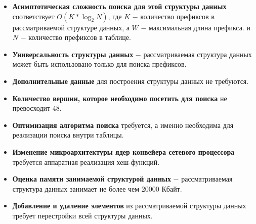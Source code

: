 \documentclass[a4paper, 12pt, titlepage, finall]{extreport}
\begin{document}
            \begin{itemize}
                \item\textbf{Асимптотическая сложность поиска для этой структуры данных} соответствует {\ttfamily $O(K*\log_2{N})$},
                где {\ttfamily $K$} $-$ количество префиксов в рассматриваемой структуре данных, а {\ttfamily $W$} $-$ максимальная длина префикса.
                и {\ttfamily $N$} $-$ количество префиксов в таблице.
                \item\textbf{Универсальность структуры данных} $-$ рассматриваемая структура данных может быть использовано только для поиска префиксов.
                \item\textbf{Дополнительные данные} для построения структуры данных не требуются.
                \item\textbf{Количество вершин, которое необходимо посетить для поиска} не превосходит 48.
                \item\textbf{Оптимизация алгоритма поиска} требуется, а именно необходима для реализации поиска внутри таблицы.
                \item\textbf{Изменение микроархитектуры ядер конвейера сетевого процессора} требуется аппаратная реализация хеш-функций.
                \item\textbf{Оценка памяти занимаемой структурой данных} $-$ рассматриваемая структура данных занимает не более чем 20000 Кбайт.
                \item\textbf{Добавление и удаление элементов} из рассматриваемой структуры данных требует перестройки всей структуры данных.
            \end{itemize}
\end{document}
